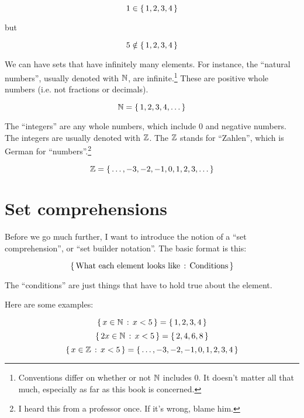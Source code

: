 \begin{displaymath}
  1 \in \left\{ \, 1,2,3,4 \, \right\}
\end{displaymath}

but 

\begin{displaymath}
  5 \notin \left\{ \, 1,2,3,4 \, \right\}
\end{displaymath}

We can have sets that have infinitely many elements. For instance, the
``natural numbers'', usually denoted with $\mathbb{N}$, are
infinite.\footnote{Conventions differ on whether or not $\mathbb{N}$ includes
  $0$. It doesn't matter all that much, especially as far as this book
  is concerned.} These are positive whole numbers (i.e. not fractions
or decimals).

\begin{displaymath}
  \mathbb{N} = \left\{ \, 1,2,3,4,\dots \, \right\}
\end{displaymath}

The ``integers'' are any whole numbers, which include $0$ and negative
numbers. The integers are usually denoted with $\mathbb{Z}$. The $\mathbb{Z}$ stands
for ``Zahlen'', which is German for ``numbers''.\footnote{I heard this
  from a professor once. If it's wrong, blame him.}

\begin{displaymath}
  \mathbb{Z} = \left\{ \, \dots, -3, -2, -1, 0, 1, 2, 3, \dots \, \right\}
\end{displaymath}

\section{Set comprehensions}

Before we go much further, I want to introduce the notion of a ``set
comprehension'', or ``set builder notation''. The basic format is this:

\begin{displaymath}
  \left\{ \,  \text{\rmfamily What each element looks like} \, : \, \text{\rmfamily Conditions}  \, \right\}
\end{displaymath}

The ``conditions'' are just things that have to hold true about the
element.

Here are some examples:

\begin{displaymath}
  \left\{ \,  x \in \mathbb{N} \, : \, x < 5  \, \right\} = \left\{ \, 1,2,3,4 \, \right\}
\end{displaymath}
\begin{displaymath}
  \left\{ \,  2x \in \mathbb{N} \, : \, x < 5  \, \right\} = \left\{ \, 2,4,6,8 \, \right\}
\end{displaymath}
\begin{displaymath}
  \left\{ \,  x \in \mathbb{Z} \, : \, x < 5  \, \right\} = \left\{ \, \dots,-3,-2,-1,0,1,2,3,4 \, \right\}
\end{displaymath}

